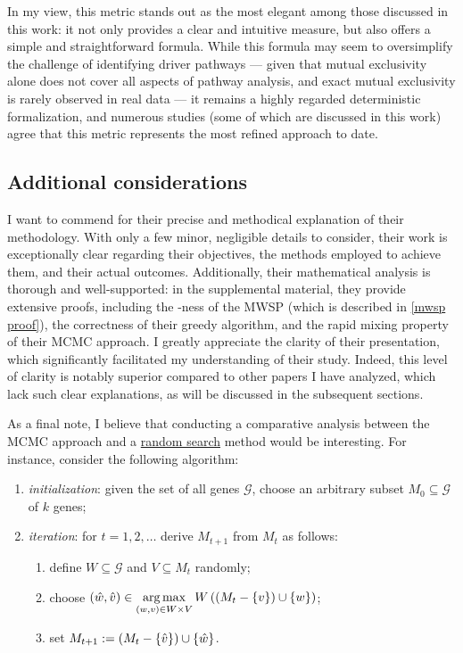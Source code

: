 In my view, this metric stands out as the most elegant among those discussed in this work: it not only provides a clear and intuitive measure, but also offers a simple and straightforward formula. While this formula may seem to oversimplify the challenge of identifying driver pathways --- given that mutual exclusivity alone does not cover all aspects of pathway analysis, and exact mutual exclusivity is rarely observed in real data --- it remains a highly regarded deterministic formalization, and numerous studies (some of which are discussed in this work) agree that this metric represents the most refined approach to date.

\subsection{Additional considerations}

I want to commend \textcite{dendrix} for their precise and methodical explanation of their methodology. With only a few minor, negligible details to consider, their work is exceptionally clear regarding their objectives, the methods employed to achieve them, and their actual outcomes. Additionally, their mathematical analysis is thorough and well-supported: in the supplemental material, they provide extensive proofs, including the \NPHard-ness of the MWSP (which is described in \cref{mwsp proof}), the correctness of their greedy algorithm, and the rapid mixing property of their MCMC approach. I greatly appreciate the clarity of their presentation, which significantly facilitated my understanding of their study. Indeed, this level of clarity is notably superior compared to other papers I have analyzed, which lack such clear explanations, as will be discussed in the subsequent sections.

As a final note, I believe that conducting a comparative analysis between the MCMC approach and a \href{https://en.wikipedia.org/wiki/Random_search}{random search} method would be interesting. For instance, consider the following algorithm:

\begin{enumerate}
    \item \textit{initialization}: given the set of all genes $\mathcal G$, choose an arbitrary subset $M_0 \subseteq \mathcal G$ of $k$ genes;
    \item \textit{iteration}: for $t = 1, 2, \ldots$ derive $M_{t + 1}$ from $M_t$ as follows:

    \begin{enumerate}
        \item define $W \subseteq \mathcal G$ and $V \subseteq M_t$ randomly;
        \item choose $\displaystyle (\hat w, \hat v) \in \operatorname*{arg\,max}_{(w, v) \in W \times V}{W\left(\left(M_t - \{v\}\right) \cup \{w\}\right)}$;
        \item set $M_{t + 1} := \left(M_t - \{\hat v\}\right) \cup \{\hat w\}$.
    \end{enumerate}
\end{enumerate}

